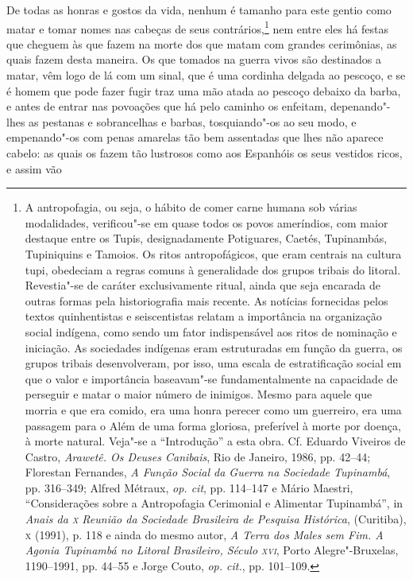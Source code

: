 De todas as honras e gostos da vida, nenhum é tamanho para
este gentio como matar e tomar nomes nas cabeças de seus 
contrários,\footnote{ A antropofagia, ou seja, o hábito de comer carne humana sob
várias modalidades, verificou"-se em quase todos os povos ameríndios,
com maior destaque entre os Tupis, designadamente Potiguares, Caetés,
Tupinambás, Tupiniquins e Tamoios. Os ritos antropofágicos, que eram
centrais na cultura tupi, obedeciam a regras comuns à generalidade dos
grupos tribais do litoral. Revestia"-se de caráter exclusivamente
ritual, ainda que seja encarada de outras formas pela historiografia
mais recente. As notícias fornecidas pelos textos quinhentistas e
seiscentistas relatam a importância na organização social indígena,
como sendo um fator indispensável aos ritos de nominação e iniciação.
As sociedades indígenas eram estruturadas em função da guerra, os
grupos tribais desenvolveram, por isso, uma escala de estratificação
social em que o valor e importância baseavam"-se fundamentalmente na
capacidade de perseguir e matar o maior número de inimigos. Mesmo para
aquele que morria e que era comido, era uma honra perecer como um
guerreiro, era uma passagem para o Além de uma forma gloriosa,
preferível à morte por doença, à morte natural. Veja"-se a ``Introdução''
a esta obra. Cf. Eduardo Viveiros de Castro, \textit{Arawetê. Os
Deuses Canibais}, Rio de Janeiro, 1986, pp. 42--44; Florestan Fernandes,
\textit{A Função Social da Guerra na Sociedade Tupinambá}, pp. 316--349;
Alfred Métraux, \textit{op. cit}, pp. 114--147 e Mário Maestri, ``Considerações 
sobre a Antropofagia Cerimonial e Alimentar Tupinambá'',
in \textit{Anais da \textsc{x} Reunião da Sociedade Brasileira de Pesquisa
Histórica}, (Curitiba), \textsc{x} (1991), p. 118 e ainda do mesmo autor,
\textit{A Terra dos Males sem Fim. A Agonia Tupinambá no Litoral
Brasileiro, Século \textsc{xvi}}, Porto Alegre"-Bruxelas, 1190--1991, pp. 44--55 e
Jorge Couto, \textit{op. cit.}, pp. 101--109.} nem entre eles há festas
que cheguem às que fazem na morte dos que matam com grandes cerimônias,
as quais fazem desta maneira. Os que tomados na guerra vivos são
destinados a matar, vêm logo de lá com um sinal, que é uma cordinha
delgada ao pescoço, e se é homem que pode fazer fugir traz uma mão
atada ao pescoço debaixo da barba, e antes de entrar nas povoações que
há pelo caminho os enfeitam, depenando"-lhes as pestanas e sobrancelhas
e barbas, tosquiando"-os ao seu modo, e empenando"-os com penas amarelas
tão bem assentadas que lhes não aparece cabelo: as quais os fazem tão
lustrosos como aos Espanhóis os seus vestidos ricos, e assim vão
